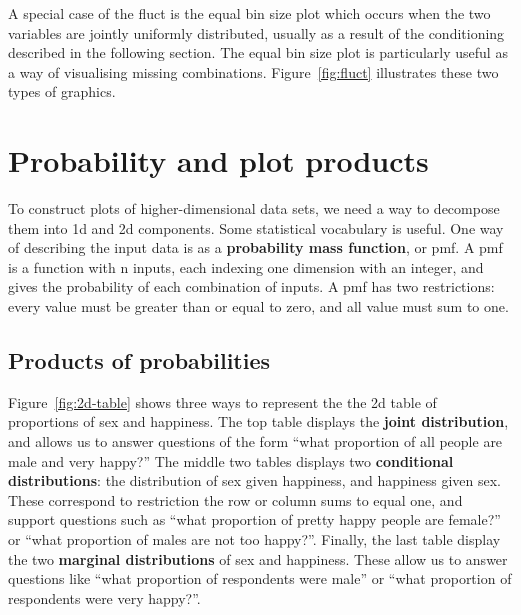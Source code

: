 \documentclass[journal]{vgtc}
\begin{document}
A special case of the fluct is the equal bin size plot \citep{hofmann:2000} which occurs when the two variables are jointly uniformly distributed, usually as a result of the conditioning described in the following section. The equal bin size plot is particularly useful as a way of visualising missing combinations. Figure~\ref{fig:fluct} illustrates these two types of graphics.

\section{Probability and plot products}
\label{sec:combination}

To construct plots of higher-dimensional data sets, we need a way to decompose them into 1d and 2d components. Some statistical vocabulary is useful. One way of describing the input data is as a {\bf probability mass function}, or {\sc pmf}. A {\sc pmf} is a function with n inputs, each indexing one dimension with an integer, and gives the probability of each combination of inputs. A {\sc pmf} has two restrictions: every value must be greater than or equal to zero, and all value must sum to one.  

\subsection{Products of probabilities}

Figure~\ref{fig:2d-table} shows three ways to represent the the 2d table of proportions of sex and happiness. The top table displays the {\bf joint distribution}, and allows us to answer questions of the form ``what proportion of all people are male and very happy?'' The middle two tables displays two {\bf conditional distributions}: the distribution of sex given happiness, and happiness given sex. These correspond to restriction the row or column sums to equal one, and support questions such as ``what proportion of pretty happy people are female?'' or ``what proportion of males are not too happy?''. Finally, the last table display the two {\bf marginal distributions} of sex and happiness. These allow us to answer questions like ``what proportion of respondents were male'' or ``what proportion of respondents were very happy?''.
\end{document}
